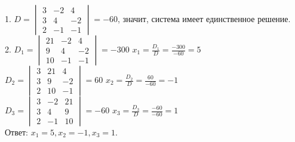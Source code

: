 \documentclass[12pt,a4paper]{article}
\begin{document}
1. $D = \begin{vmatrix}
3& -2& 4 \\
3& 4& -2 \\
2& -1& -1
\end{vmatrix} = -60$, значит, система имеет единственное решение. \\
2. $D_{1} = \begin{vmatrix}
21& -2& 4 \\
9& 4& -2 \\
10& -1& -1
\end{vmatrix} = -300$ 
$x_{1} = \frac{D_{1}}{D} = \frac{-300}{-60} = 5$ \\
$D_{2} = \begin{vmatrix}
3& 21& 4 \\
3& 9& -2 \\
2& 10& -1
\end{vmatrix} = 60$ 
$x_{2} = \frac{D_{2}}{D} = \frac{60}{-60} = -1$ \\
$D_{3} = \begin{vmatrix}
3& -2& 21 \\
3& 4& 9 \\
2& -1& 10
\end{vmatrix} = -60$ 
$x_{3} = \frac{D_{3}}{D} = \frac{-60}{-60} = 1$ \\
Ответ: $x_{1} = 5, x_{2} = -1, x_{3} = 1$.
\end{document}
